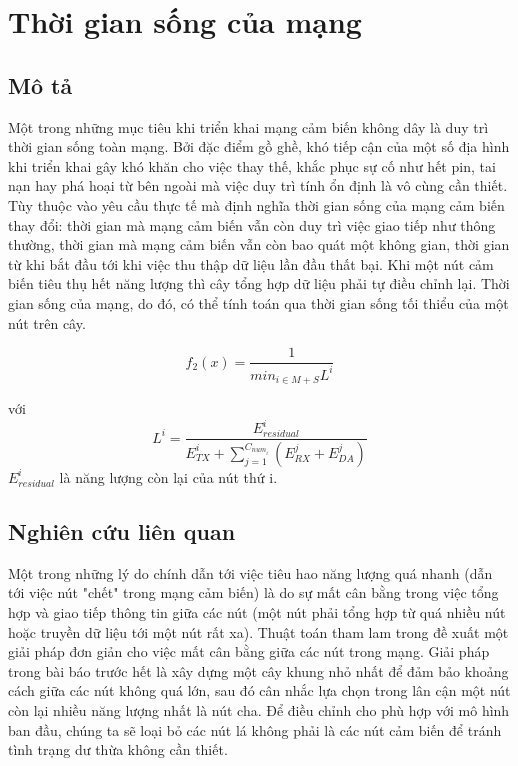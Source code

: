 \section{Thời gian sống của mạng}
\subsection{Mô tả}
Một trong những mục tiêu khi triển khai mạng cảm biến không dây là duy trì thời gian sống toàn mạng. Bởi đặc điểm gồ ghề, khó tiếp cận của một số địa hình khi triển khai gây khó khăn cho việc thay thế, khắc phục sự cố như hết pin, tai nạn hay phá hoại từ bên ngoài mà việc duy trì tính ổn định là vô cùng cần thiết. Tùy thuộc vào yêu cầu thực tế mà định nghĩa thời gian sống của mạng cảm biến thay đổi: thời gian mà mạng cảm biến vẫn còn duy trì việc giao tiếp như thông thường, thời gian mà mạng cảm biến vẫn còn bao quát một không gian, thời gian từ khi bắt đầu tới khi việc thu thập dữ liệu lần đầu thất bại. Khi một nút cảm biến tiêu thụ hết năng lượng thì cây tổng hợp dữ liệu phải tự điều chỉnh lại. Thời gian sống của mạng, do đó, có thể tính toán qua thời gian sống tối thiểu của một nút trên cây.

\begin{equation}
f_2(x) = \frac{1}{min_{i \in M+S}  L^i}
\end{equation}

với
\begin{equation}
L^i = \frac{E^i_{residual}}{E^i_{TX} + \sum_{j=1}^{C_{num_i}} (E_{RX}^j + E_{DA}^j)}
\end{equation}
$E^i_{residual}$ là năng lượng còn lại của nút thứ i.
\subsection{Nghiên cứu liên quan}
Một trong những lý do chính dẫn tới việc tiêu hao năng lượng quá nhanh (dẫn tới việc nút "chết" trong mạng cảm biến) là do sự mất cân bằng trong việc tổng hợp và giao tiếp thông tin giữa các nút (một nút phải tổng hợp từ quá nhiều nút hoặc truyền dữ liệu tới một nút rất xa). Thuật toán tham lam trong \cite{liu2019heuristic} đề xuất một giải pháp đơn giản cho việc mất cân bằng giữa các nút trong mạng. Giải pháp trong bài báo trước hết là xây dựng một cây khung nhỏ nhất để đảm bảo khoảng cách giữa các nút không quá lớn, sau đó cân nhắc lựa chọn trong lân cận một nút còn lại nhiều năng lượng nhất là nút cha. Để điều chỉnh cho phù hợp với mô hình ban đầu, chúng ta sẽ loại bỏ các nút lá không phải là các nút cảm biến để tránh tình trạng dư thừa không cần thiết.


